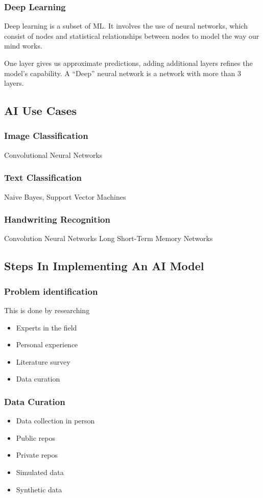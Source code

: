 \documentclass[11pt]{article}
\begin{document}
\subsubsection{Deep Learning}
\label{sec:org2dbbd68}
Deep learning is a subset of ML.
It involves the use of neural networks, which consist of nodes and statistical relationships between nodes to model the way our mind works.

One layer gives us approximate predictions, adding additional layers refines the model's capability. A ``Deep'' neural network is a network with more than 3 layers.
\subsection{AI Use Cases}
\label{sec:org97638c7}
\subsubsection{Image Classification}
\label{sec:orgc2aaeb2}
Convolutional Neural Networks
\subsubsection{Text Classification}
\label{sec:orgc9e9c75}
Naive Bayes, Support Vector Machines
\subsubsection{Handwriting Recognition}
\label{sec:orgb3a0bc2}
Convolution Neural Networks
Long Short-Term Memory Networks
\subsection{Steps In Implementing An AI Model}
\label{sec:org61f26ec}
\subsubsection{Problem identification}
\label{sec:orgf657e26}
This is done by researching
\begin{itemize}
\item Experts in the field
\item Personal experience
\item Literature survey
\item Data curation
\end{itemize}
\subsubsection{Data Curation}
\label{sec:org09614ff}
\begin{itemize}
\item Data collection in person
\item Public repos
\item Private repos
\item Simulated data
\item Synthetic data
\end{itemize}
\end{document}
